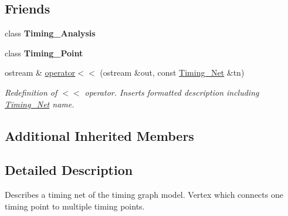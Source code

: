 \subsection*{Friends}
\begin{DoxyCompactItemize}
\item 
\hypertarget{classTiming__Analysis_1_1Timing__Net_aab560f9cdcd55852a6a08a29a54a2b16}{class {\bfseries Timing\-\_\-\-Analysis}}\label{classTiming__Analysis_1_1Timing__Net_aab560f9cdcd55852a6a08a29a54a2b16}

\item 
\hypertarget{classTiming__Analysis_1_1Timing__Net_a2562d249ea959d9e392abdffe35cdbad}{class {\bfseries Timing\-\_\-\-Point}}\label{classTiming__Analysis_1_1Timing__Net_a2562d249ea959d9e392abdffe35cdbad}

\item 
ostream \& \hyperlink{classTiming__Analysis_1_1Timing__Net_affa1b519dc847065ac579b4c8726c740}{operator$<$$<$} (ostream \&out, const \hyperlink{classTiming__Analysis_1_1Timing__Net}{Timing\-\_\-\-Net} \&tn)
\begin{DoxyCompactList}\small\item\em Redefinition of $<$$<$ operator. Inserts formatted description including \hyperlink{classTiming__Analysis_1_1Timing__Net}{Timing\-\_\-\-Net} name. \end{DoxyCompactList}\end{DoxyCompactItemize}
\subsection*{Additional Inherited Members}


\subsection{Detailed Description}
Describes a timing net of the timing graph model. Vertex which connects one timing point to multiple timing points. 



